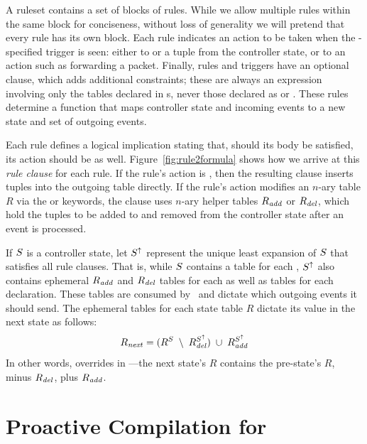 A ruleset contains a set of  blocks of rules. While we allow
multiple rules within the same  block for conciseness, without loss of
generality we will pretend that every rule has its own  block. Each
rule indicates an action to be taken when the -specified trigger is
seen: either to  or  a tuple from the controller state,
or to  an action such as forwarding a packet. Finally, rules and triggers have an
optional  clause, which adds additional constraints; these are always an
expression involving only the tables declared in s, never
those declared as  or . 
These rules determine a function that maps controller state and incoming
events to a new state and set of outgoing events.

Each rule defines a logical implication
stating that, should its body be satisfied, its action should be as well. 
Figure~\ref{fig:rule2formula} shows how we arrive at this \emph{rule clause} for each rule.
If the rule's action is , then the resulting clause inserts tuples into the outgoing table directly. 
If the rule's action modifies an $n$-ary table $R$ via the  or  keywords, the clause
uses $n$-ary helper tables $R_{\mathit{add}}$ or $R_{\mathit{del}}$, which hold the tuples to be
added to and removed from the controller state after an event is processed.

If $S$ is a controller state, let $S^{\uparrow}$ represent the unique least expansion
of $S$ that satisfies all rule clauses. That is, while $S$ contains a table
for each , $S^{\uparrow}$ also contains ephemeral $R_{\mathit{add}}$ and $R_{\mathit{del}}$
tables for each  as well as tables for each 
declaration. These  tables are consumed by \flowlog\ and dictate which outgoing events it should send. The ephemeral
tables for each state table $R$ dictate its value in the next state
as follows: 
\[R_{\mathit{next}} = (R^{S} \; \setminus \; R_{\mathit{del}}^{S^{\uparrow}}) \; \cup \; R_{\mathit{add}}^{S^{\uparrow}}\]
In other words,  overrides  in \flowlog---the next state's $R$ contains
the pre-state's $R$, minus $R_{\mathit{del}}$, plus $R_{\mathit{add}}$.


\section{Proactive Compilation for \flowlog}
\label{sec:proactive}

